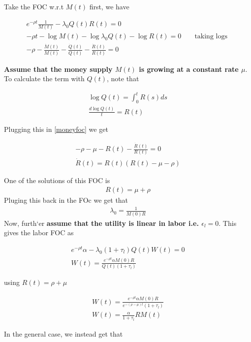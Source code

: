 Take the FOC w.r.t $M(t)$ first, we have

\begin{align} \label{moneyfoc}
  e^{- \rho t} \frac{1}{M(t)} - \lambda_0 Q(t) R(t)  = 0 \\
  - \rho t - \log M(t) - \log \lambda_0 Q(t) - \log R(t) = 0 && \text{ taking logs } \\
  - \rho - \frac{\dot M (t)}{M(t)} - \frac{\dot Q (t)}{Q(t)} - \frac{\dot R (t)}{R(t)} =  0
\end{align}

\textbf{Assume that the money supply $M(t)$ is growing at a constant rate $\mu$}. To calculate the term with $Q(t)$, note that

\begin{align}
  \log Q(t) = \int_0^t R(s)ds \\
  \frac{d \log Q(t)}{t} = R(t)
\end{align}

Plugging this in \ref{moneyfoc} we get

\begin{align}
  - \rho - \mu - R(t)  - \frac{\dot R (t)}{R(t)} = 0 \\
  \dot R(t) = R(t) (R(t) - \mu - \rho)
\end{align}

One of the solutions of this FOC is
\begin{align}
  R(t) = \mu + \rho
\end{align}
Pluging this back in the FOc we get that
\begin{align}
  \lambda_0 = \frac{1}{M(0)R}
\end{align}
Now, furth`er \textbf{assume that the utility is linear in labor i.e. $\epsilon_l = 0$}. This gives the labor FOC as

\begin{align}
   e^{- \rho t} \alpha  - \lambda_0 (1+\tau_l) Q(t) W(t) = 0 \\
   W(t) = \frac{ e^{- \rho t} \alpha M(0)R}{Q(t) (1+\tau_l)}
\end{align}

using $R(t) = \rho + \mu$

\begin{align}
   W(t) = \frac{ e^{- \rho t} \alpha M(0)R}{e^{ - (\rho - \mu)t} (1+\tau_l)} \\
   W(t) = \frac{\alpha}{1+\tau_l} R M(t)
\end{align}

In the general case, we instead get that

